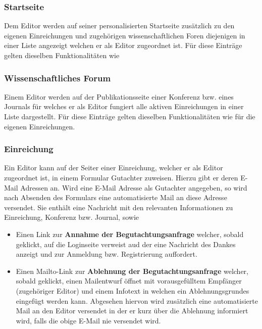 \subsubsection{Startseite}
\begin{description}
    \XXitem{} Dem Editor werden auf seiner personalisierten Startseite zusätzlich zu den eigenen
    Einreichungen und zugehörigen wissenschaftlichen Foren diejenigen in einer
    Liste angezeigt welchen er als Editor zugeordnet ist.
    Für diese Einträge gelten dieselben Funktionalitäten wie  %
\end{description}

\subsubsection{Wissenschaftliches Forum}
\begin{description}
    \XXitem{} Einem Editor werden auf der Publikationsseite einer Konferenz bzw. eines Journals für
    welches er als Editor fungiert alle aktiven Einreichungen in einer Liste dargestellt.
    Für diese Einträge gelten dieselben Funktionalitäten wie für die eigenen Einreichungen. %
\end{description}

\subsubsection{Einreichung}
\begin{description}
    \XXitem{} Ein Editor kann auf der Seiter einer Einreichung, welcher er als Editor zugeordnet ist,
    in einem Formular Gutachter zuweisen. Hierzu gibt er deren E-Mail Adressen an.
    \XXitem{} Wird eine E-Mail Adresse als Gutachter angegeben, so wird nach Absenden des Formulars
    eine automatisierte Mail an diese Adresse versendet. Sie enthält eine Nachricht mit den relevanten
    Informationen zu Einreichung, Konferenz bzw. Journal, sowie
    \begin{itemize}
        \item Einen Link zur \textbf{Annahme der Begutachtungsanfrage} welcher, sobald geklickt,
        auf die Loginseite verweist aud der eine Nachricht des Dankes anzeigt und zur Anmeldung bzw.
        Registrierung auffordert.
        \item Einen Mailto-Link zur \textbf{Ablehnung der Begutachtungsanfrage} welcher, sobald
        geklickt, einen Mailentwurf öffnet mit vorausgefülltem Empfänger (zugehöriger Editor)
        und einem Infotext in welchen ein Ablehnungsgrundes eingefügt werden kann.
        Abgesehen hiervon wird zusätzlich eine automatisierte Mail an den Editor versendet in der er
        kurz über die Ablehnung informiert wird, falls die obige E-Mail nie versendet wird.
    \end{itemize}
\end{description}

